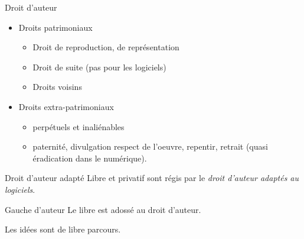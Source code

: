 \documentclass{beamer}
\begin{document}
\begin{frame}{Droit d'auteur}

  \begin{itemize}
  \item Droits patrimoniaux
    \begin{itemize}
    \item Droit de reproduction, de représentation
    \item Droit de suite (pas pour les logiciels)
    \item Droits voisins
    \end{itemize}
  \item Droits extra-patrimoniaux
    \begin{itemize}
    \item perpétuels et inaliénables
    \item paternité, divulgation respect de l'oeuvre, repentir,
      retrait (quasi éradication dans le numérique).
    \end{itemize}
  \end{itemize}

 \begin{alertblock}{Droit d'auteur adapté}
   Libre et privatif sont régis par le \textit{droit d'auteur adaptés
     au logiciels}.
 \end{alertblock}

  \begin{alertblock}{Gauche d'auteur}
    Le libre est adossé au droit d'auteur.
  \end{alertblock}
  
  Les idées sont de libre parcours.
\end{frame}


\begin{frame}[plain]%
%  
\end{frame}
\end{document}
